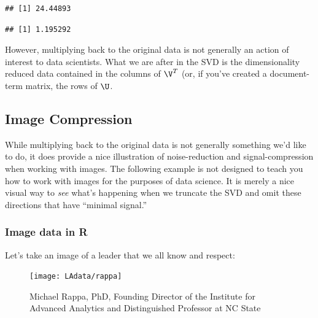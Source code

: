 \documentclass[
]{article}
\newenvironment{Shaded}{\begin{snugshade}}{\end{snugshade}}
\newcommand{\CommentTok}[1]{\textcolor[rgb]{0.56,0.35,0.01}{\textit{#1}}}
\newcommand{\DecValTok}[1]{\textcolor[rgb]{0.00,0.00,0.81}{#1}}
\newcommand{\FunctionTok}[1]{\textcolor[rgb]{0.00,0.00,0.00}{#1}}
\newcommand{\NormalTok}[1]{#1}
\newcommand{\SpecialCharTok}[1]{\textcolor[rgb]{0.00,0.00,0.00}{#1}}
\theoremstyle{definition}
\theoremstyle{definition}
\theoremstyle{definition}
\theoremstyle{definition}
\theoremstyle{remark}
\begin{document}
\begin{verbatim}
## [1] 24.44893
\end{verbatim}

\begin{Shaded}
\end{Shaded}

\begin{verbatim}
## [1] 1.195292
\end{verbatim}

However, multiplying back to the original data is not generally an action of interest to data scientists. What we are after in the SVD is the dimensionality reduced data contained in the columns of \(\V^T\) (or, if you've created a document-term matrix, the rows of \(\U\).

\hypertarget{rappasvd}{%
\subsection{Image Compression}\label{rappasvd}}

While multiplying back to the original data is not generally something we'd like to do, it does provide a nice illustration of noise-reduction and signal-compression when working with images. The following example is not designed to teach you how to work with images for the purposes of data science. It is merely a nice visual way to \emph{see} what's happening when we truncate the SVD and omit these directions that have ``minimal signal.''

\hypertarget{image-data-in-r}{%
\subsubsection{Image data in R}\label{image-data-in-r}}

Let's take an image of a leader that we all know and respect:

\begin{figure}

{\centering \texttt{[image: LAdata/rappa]} 

}

\caption{Michael Rappa, PhD, Founding Director of the Institute for Advanced Analytics and Distinguished Professor at NC State}\label{fig:unnamed-chunk-109}
\end{figure}
\end{document}
